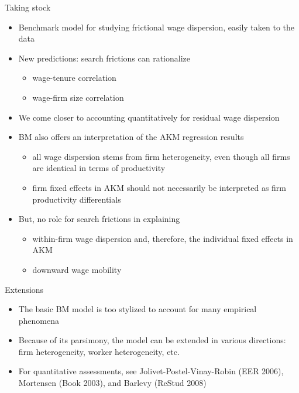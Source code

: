 \documentclass[9pt]{beamer}
\newcommand{\bit}{\begin{itemize}}
\newcommand{\eit}{\end{itemize}}
\begin{document}
\begin{frame}{Taking stock}

\bit
\setlength\itemsep{1.5em}

\item Benchmark model for studying frictional wage dispersion, easily taken to the data

\item New predictions: search frictions can rationalize
\bit
\setlength\itemsep{0.5em}
	\item wage-tenure correlation
	\item wage-firm size correlation
\eit

\item We come closer to accounting quantitatively for residual wage dispersion

\item BM also offers an interpretation of the AKM regression results
	\bit
	\setlength\itemsep{0.5em}
		\item all wage dispersion stems from firm heterogeneity, even though all firms are identical in terms of productivity
		\item firm fixed effects in AKM should not necessarily be interpreted as firm productivity differentials
	\eit


\item But, no role for search frictions in explaining
\bit
\setlength\itemsep{0.5em}
	\item within-firm wage dispersion and, therefore, the individual fixed effects in AKM
	
	\item downward wage mobility
\eit
%

\eit


\end{frame}


\begin{frame}{Extensions}

\bit
\setlength\itemsep{1.5em}

\item The basic BM model is too stylized to account for many empirical phenomena

\item Because of its parsimony, the model can be extended in various directions: firm heterogeneity, worker heterogeneity, etc.

\item For quantitative assessments, see Jolivet-Postel-Vinay-Robin (EER 2006), Mortensen (Book 2003), and Barlevy (ReStud 2008)


\eit


\end{frame}
\end{document}
